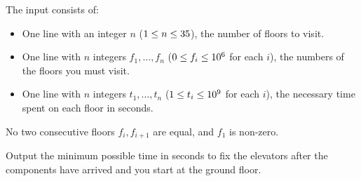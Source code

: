 \begin{Input}
    The input consists of:
    \begin{itemize}
        \item One line with an integer $n$ ($1\leq n\leq 35$), the number of floors to visit.
        \item One line with $n$ integers $f_1,\ldots,f_n$ ($0\leq f_i\leq10^6$ for each $i$), the numbers of the floors you must visit.
        \item One line with $n$ integers $t_1,\ldots,t_n$ ($1\leq t_i\leq10^9$ for each $i$), the necessary time spent on each floor in seconds.
    \end{itemize}
    No two consecutive floors $f_i,f_{i+1}$ are equal, and $f_1$ is non-zero.
\end{Input}

\begin{Output}
    Output the minimum possible time in seconds to fix the elevators after the components have arrived and you start at the ground floor.
\end{Output}
